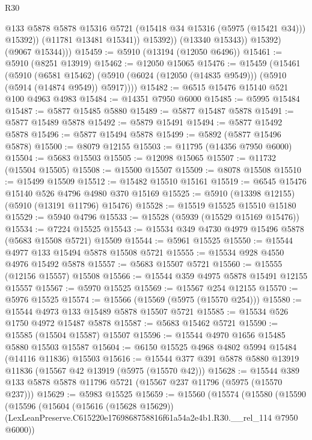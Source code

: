\begin{lexlean}{R30}
\begin{coremodule}
                      @133
                      @5878
                      @5878
                      @15316
                      @5721
                      (@15418 @34 @15316 (@5975 (@15421 @34)))
                      @15392))
                  (@11781 @13481 @15341))
                @15392))
            (@13340 @15343))
          @15392)
        (@9067 @15344)))
@15459 := @5910 (@13194 (@12050 @6496))
@15461 := @5910 (@8251 @13919)
@15462 := @12050 @15065
@15476 := @15459
    (@15461
      (@5910
        (@6581 @15462)
        (@5910 (@6024 (@12050 (@14835 @9549))) (@5910 (@5914 (@14874 @9549)) @5917))))
@15482 := @6515 @15476 @15140 @521 @100 @4963 @4983
@15484 := @14351 @7950 @6000
@15485 := @5995 @15484
@15487 := @5877 @15485 @5880
@15489 := @5877 @15487 @5878
@15491 := @5877 @15489 @5878
@15492 := @5879 @15491
@15494 := @5877 @15492 @5878
@15496 := @5877 @15494 @5878
@15499 := @5892 (@5877 @15496 @5878)
@15500 := @8079 @12155
@15503 := @11795 (@14356 @7950 @6000)
@15504 := @5683 @15503
@15505 := @12098 @15065
@15507 := @11732 (@15504 @15505)
@15508 := @15500 @15507
@15509 := @8078 @15508
@15510 := @15499 @15509
@15512 := @15482 @15510 @15161
@15519 := @6545 @15476 @15140 @526 @4796 @4980 @370 @15169
@15525 := @5910 (@13398 @12155) (@5910 (@13191 @11796) @15476)
@15528 := @15519 @15525 @15510 @15180
@15529 := @5940 @4796
@15533 := @15528 (@5939 (@15529 @15169 @15476))
@15534 := @7224 @15525
@15543 := @15534 @349 @4730 @4979 @15496 @5878 (@5683 @15508 @5721) @15509
@15544 := @5961 @15525
@15550 := @15544 @4977 @133 @15494 @5878 @15508 @5721
@15555 := @15534 @928 @4550 @4976 @15492 @5878
@15557 := @5683 @15507 @5721
@15560 := @15555 (@12156 @15557) @15508
@15566 := @15544 @359 @4975 @5878 @15491 @12155 @15557
@15567 := @5970 @15525
@15569 := @15567 @254 @12155
@15570 := @5976 @15525
@15574 := @15566 (@15569 (@5975 (@15570 @254)))
@15580 := @15544 @4973 @133 @15489 @5878 @15507 @5721
@15585 := @15534 @526 @1750 @4972 @15487 @5878
@15587 := @5683 @15462 @5721
@15590 := @15585 (@15504 @15587) @15507
@15596 := @15544 @4970 @1656 @15485 @5880 @15503 @15587
@15604 := @6150 @15525 @4968 @4802 @5994 @15484 (@14116 @11836) @15503
@15616 := @15544 @377 @391 @5878 @5880 @13919 @11836 (@15567 @42 @13919 (@5975 (@15570 @42)))
@15628 := @15544 @389 @133 @5878 @5878 @11796 @5721 (@15567 @237 @11796 (@5975 (@15570 @237)))
@15629 := @5983 @15525
@15659 := @15560
    (@15574
      (@15580
        (@15590
          (@15596
            (@15604
              (@15616 (@15628 @15629))
              (LexLeanPreserve.C615220e1769868758816f61a54a2e4b1.R30.__rel_114 @7950 @6000))

\end{coremodule}
\end{lexlean}
